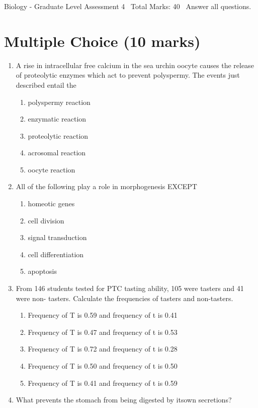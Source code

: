 \documentclass[12pt]{article}
\begin{document}
\begin{center}
Biology - Graduate Level Assessment 4 \
Total Marks: 40 \
Answer all questions.
\end{center}

\section*{Multiple Choice (10 marks)}
\begin{enumerate}[label=\arabic*.]
\item A rise in intracellular free calcium in the sea urchin oocyte causes the release of
proteolytic enzymes which act to prevent polyspermy. The events just described entail the
\begin{enumerate}[label=(\alph*)]
    \item polyspermy reaction
    \item enzymatic reaction
    \item proteolytic reaction
    \item acrosomal reaction
    \item oocyte reaction
\end{enumerate}
\item All of the following play a role in morphogenesis EXCEPT
\begin{enumerate}[label=(\alph*)]
    \item homeotic genes
    \item cell division
    \item signal transduction
    \item cell differentiation
    \item apoptosis
\end{enumerate}
\item From 146 students tested for PTC tasting ability, 105 were tasters and 41 were non-
tasters. Calculate the frequencies of tasters and non-tasters.
\begin{enumerate}[label=(\alph*)]
    \item Frequency of T is 0.59 and frequency of t is 0.41
    \item Frequency of T is 0.47 and frequency of t is 0.53
    \item Frequency of T is 0.72 and frequency of t is 0.28
    \item Frequency of T is 0.50 and frequency of t is 0.50
    \item Frequency of T is 0.41 and frequency of t is 0.59
\end{enumerate}
\item What prevents the stomach from being digested by itsown secretions?

\end{enumerate}
\end{document}
